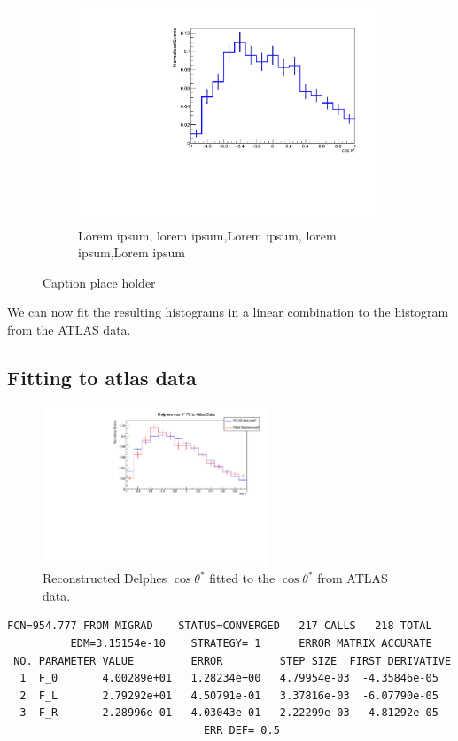 \documentclass[12pt,a4paper]{article}
\begin{document}
\begin{figure}[t!]
\begin{subfigure}[t]{0.5\textwidth}
        \includegraphics[width=1.0\textwidth]{figures/delphes_ctstar0}
        \caption{Lorem ipsum, lorem ipsum,Lorem ipsum, lorem ipsum,Lorem ipsum}
    \end{subfigure}
    \caption{Caption place holder}
\end{figure}
We can now fit the resulting histograms in a linear combination to the histogram from the ATLAS data.
\cleardoublepage{}
\subsection{Fitting to atlas data}
\begin{figure}[H]
  \centering
  \includegraphics[width=0.6\textwidth]{figures/delphes_fit}
  \caption{\label{fig:delphesfit}Reconstructed Delphes $\cos \theta^{*}$ fitted to
    the $\cos \theta^{*}$ from ATLAS data.}
\end{figure}

\begin{verbatim}
FCN=954.777 FROM MIGRAD    STATUS=CONVERGED   217 CALLS   218 TOTAL
          EDM=3.15154e-10    STRATEGY= 1      ERROR MATRIX ACCURATE
 NO. PARAMETER VALUE         ERROR         STEP SIZE  FIRST DERIVATIVE
  1  F_0       4.00289e+01   1.28234e+00   4.79954e-03  -4.35846e-05
  2  F_L       2.79292e+01   4.50791e-01   3.37816e-03  -6.07790e-05
  3  F_R       2.28996e-01   4.03043e-01   2.22299e-03  -4.81292e-05
                               ERR DEF= 0.5
\end{verbatim}
\end{document}
